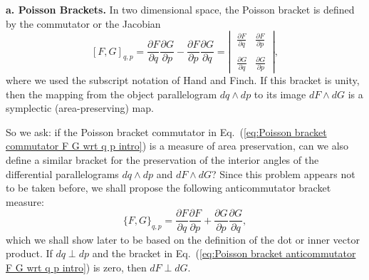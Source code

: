 \documentclass[11pt,twocolumn]{article}
\begin{document}
\textbf{a.  Poisson Brackets.}  In two dimensional space, the Poisson bracket\cite{MarsdenRatiu_1994_IntroductiontoMechanicsandSymmetry_p4} is defined by the commutator or the Jacobian
\begin{equation}
\label{eq:Poisson bracket commutator F G wrt q p intro}
[F,G]_{q,p}=\frac{\partial F}{\partial q}\frac{\partial G}{\partial p}-\frac{\partial F}{\partial p}\frac{\partial G}{\partial q}=
\left |
\begin{matrix}
\ \displaystyle\frac{\partial F}{\partial q}&\displaystyle\frac{\partial F}{\partial p}\ \\
\\
\ \displaystyle\frac{\partial G}{\partial q}&\displaystyle\frac{\partial G}{\partial p}\ 
\end{matrix}
\right|,
\end{equation}
where we used the subscript notation of Hand and Finch\cite{HandFinch_1998_AnalyticalMechanics_p217}.
If this bracket is unity, then the mapping from the object parallelogram $dq\wedge dp$ to its image $dF\wedge dG$ is a symplectic (area-preserving) map.\cite{Gole_2008_ScholarpediaSymplecticMaps}  

So we ask: if the Poisson bracket commutator in Eq.~(\ref{eq:Poisson bracket commutator F G wrt q p intro}) is a measure of area preservation, can we also define a similar bracket for the preservation of the interior angles of the differential parallelograms $dq\wedge dp$ and $dF\wedge dG$?  Since this problem appears not to be taken before, we shall propose the following anticommutator bracket measure:
\begin{equation}
\label{eq:Poisson bracket anticommutator F G wrt q p intro}
\{F, G\}_{q,p}=\frac{\partial F}{\partial q}\frac{\partial F}{\partial p}+\frac{\partial G}{\partial p}\frac{\partial G}{\partial q},
\end{equation}     
which we shall show later to be based on the definition of the dot or inner vector product.  If $dq\perp dp$ and the bracket in Eq.~(\ref{eq:Poisson bracket anticommutator F G wrt q p intro}) is zero, then $dF\perp dG$. 
\end{document}
